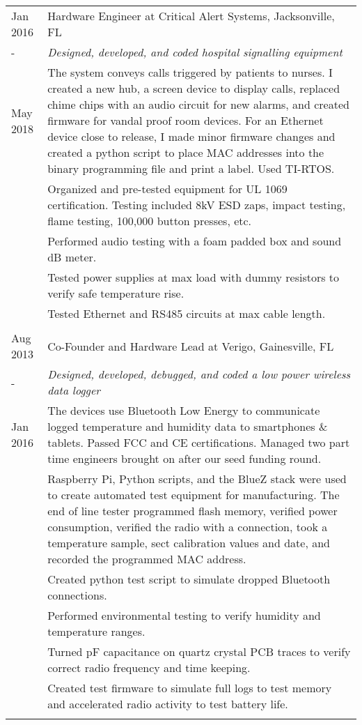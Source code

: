 \documentclass[a4paper,10pt]{article} %
\begin{document}
\begin{tabular}{p{1.6cm}|p{12.4cm}}


\centering Jan 2016 &  Hardware Engineer at Critical Alert Systems, Jacksonville, FL \\
\centering - & \emph{Designed, developed, and coded hospital signalling equipment}\\
\centering May 2018 & \footnotesize{The system conveys calls triggered by patients to nurses. I created a new hub, a screen device to display calls, replaced chime chips with an audio circuit for new alarms, and created firmware for vandal proof room devices. For an Ethernet device close to release, I made minor firmware changes and created a python script to place MAC addresses into the binary programming file and print a label. Used TI-RTOS.}\\
&\footnotesize{Organized and pre-tested equipment for UL 1069 certification. Testing included 8kV ESD zaps, impact testing, flame testing, 100,000 button presses, etc.}\\
&\footnotesize{Performed audio testing with a foam padded box and sound dB meter.}\\
&\footnotesize{Tested power supplies at max load with dummy resistors to verify safe temperature rise.}\\
&\footnotesize{Tested Ethernet and RS485 circuits at max cable length.}\\
\multicolumn{2}{c}{} \\

\centering Aug 2013 &  Co-Founder and Hardware Lead at Verigo, Gainesville, FL \\
\centering -& \emph{Designed, developed, debugged, and coded a low power wireless data logger }\\
\centering Jan 2016&\footnotesize{The devices use Bluetooth Low Energy to communicate logged temperature and humidity data to smartphones \& tablets. Passed FCC and CE certifications. Managed two part time engineers brought on after our seed funding round. }\\
&\footnotesize{Raspberry Pi, Python scripts, and the BlueZ stack were used to create automated test equipment for manufacturing. The end of line tester programmed flash memory, verified power consumption, verified the radio with a connection, took a temperature sample, sect calibration values and date, and recorded the programmed MAC address.}\\
&\footnotesize{Created python test script to simulate dropped Bluetooth connections.}\\
&\footnotesize{Performed environmental testing to verify humidity and temperature ranges.}\\
&\footnotesize{Turned pF capacitance on quartz crystal PCB traces to verify correct radio frequency and time keeping.}\\
&\footnotesize{Created test firmware to simulate full logs to test memory and accelerated radio activity to test battery life.}\\
\multicolumn{2}{c}{} \\


\end{tabular}
\end{document}
